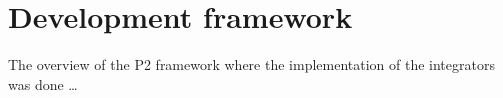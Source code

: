 \section{Development framework}
\label{section:framework}
The overview of the P2 framework where the implementation of the integrators was done
\ldots